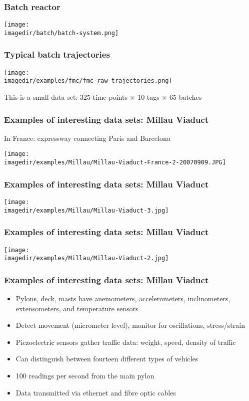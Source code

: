 \begin{frame}\frametitle{Batch reactor}

	\texttt{[image: \\imagedir/batch/batch-system.png]}
\end{frame}

\begin{frame}\frametitle{Typical batch trajectories}

	\texttt{[image: \\imagedir/examples/fmc/fmc-raw-trajectories.png]}
	
	This is a small data set: 325 time points $\times$ 10 tags $\times$ 65 batches
\end{frame}

\begin{frame}\frametitle{Examples of interesting data sets: Millau Viaduct}

	In France: expressway connecting Paris and Barcelona

	\texttt{[image: \\imagedir/examples/Millau/Millau-Viaduct-France-2-20070909.JPG]}
\end{frame}

\begin{frame}\frametitle{Examples of interesting data sets: Millau Viaduct}

	\texttt{[image: \\imagedir/examples/Millau/Millau-Viaduct-3.jpg]}
\end{frame}

\begin{frame}\frametitle{Examples of interesting data sets: Millau Viaduct}

	\texttt{[image: \\imagedir/examples/Millau/Millau-Viaduct-2.jpg]}
\end{frame}

\begin{frame}\frametitle{Examples of interesting data sets: Millau Viaduct}
	\begin{itemize}
		\item	Pylons, deck, masts have anemometers, accelerometers, inclinometers, extensometers, and temperature sensors
		\item	Detect movement (micrometer level), monitor for oscillations, stress/strain
		\item	Piezoelectric sensors gather traffic data: weight, speed, density of traffic
		\item	Can distinguish between fourteen different types of vehicles
		\item	100 readings per second from the main pylon
		\item	Data transmitted via ethernet and fibre optic cables
	\end{itemize}
\end{frame}

